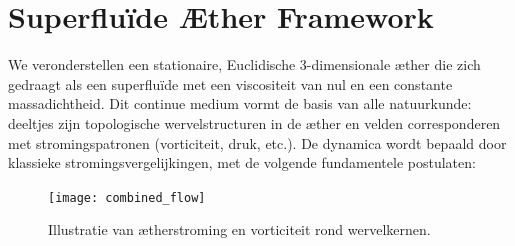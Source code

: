 \section{Superfluïde Æther Framework}

We veronderstellen een stationaire, Euclidische 3-dimensionale æther die zich gedraagt als een superfluïde met een viscositeit van nul en een constante massadichtheid. Dit continue medium vormt de basis van alle natuurkunde: deeltjes zijn topologische wervelstructuren in de æther en velden corresponderen met stromingspatronen (vorticiteit, druk, etc.). De dynamica wordt bepaald door klassieke stromingsvergelijkingen, met de volgende fundamentele postulaten:

\begin{figure}[htbp]
    \centering
    \texttt{[image: combined\_flow]}
    \caption{Illustratie van ætherstroming en vorticiteit rond wervelkernen.}
    \label{fig:vortexfields}
\end{figure}
